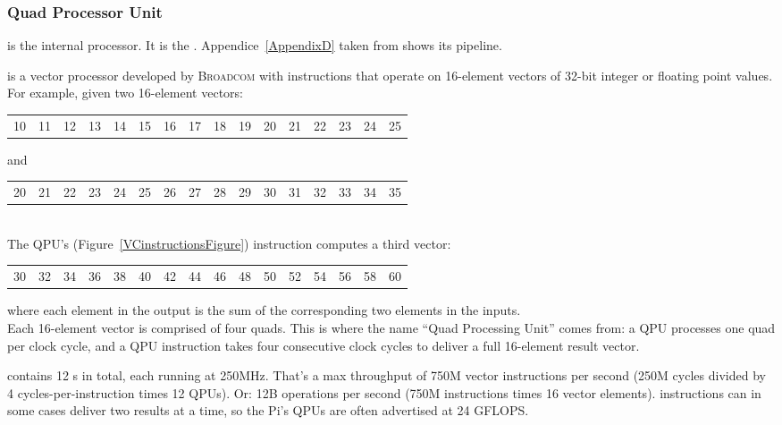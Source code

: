 \subsubsection{Quad Processor Unit}

\qpu{} is the \vc{} internal processor. It is the . Appendice~\ref{AppendixD} taken from \parencite{refVC} shows its pipeline.


\qpu{} is a  vector processor developed by \textsc{Broadcom} with instructions that operate on 16-element vectors of 32-bit integer or floating point values. For example, given two 16-element vectors:\\

\begin{tabular}{cccc|cccc|cccc|cccc}
	10&11&12&13&14&15&16&17&18&19&20&21&22&23&24&25
\end{tabular}

and

\begin{tabular}{cccc|cccc|cccc|cccc}
	20&21&22&23&24&25&26&27&28&29&30&31&32&33&34&35
\end{tabular}\\

The QPU's  (Figure~\ref{VCinstructionsFigure}) instruction computes a third vector:

\begin{tabular}{cccc|cccc|cccc|cccc}
	30&32&34&36&38&40&42&44&46&48&50&52&54&56&58&60
\end{tabular}

where each element in the output is the sum of the corresponding two elements in the inputs.\\

Each 16-element vector is comprised of four quads. This is where the name ``Quad Processing Unit'' comes from: a QPU processes one quad per clock cycle, and a QPU instruction takes four consecutive clock cycles to deliver a full 16-element result vector.

\rasp{} contains 12 \qpu{}s in total, each running at 250MHz. That's a max throughput of 750M vector instructions per second (250M cycles divided by 4 cycles-per-instruction times 12 QPUs). Or: 12B operations per second (750M instructions times 16 vector elements). \qpu{} instructions can in some cases deliver two results at a time, so the Pi's QPUs are often advertised at 24 GFLOPS.




